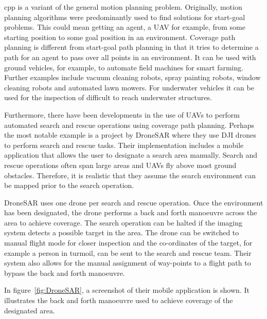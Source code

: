 \Acf{cpp} is a variant of the general motion planning problem. Originally, motion planning algorithms were predominantly used to find solutions for start-goal problems\cite{Choset2001}. This could mean getting an agent, a UAV for example, from some starting position to some goal position in an environment\cite{Lynch2017}. Coverage path planning is different from start-goal path planning in that it tries to determine a path for an agent to pass over all points in an environment\cite{Choset2001}. It can be used with ground vehicles, for example, to automate field machines for smart farming\cite{Hameed2014}. Further examples include vacuum cleaning robots, spray painting robots\cite{Atkar2005}, window cleaning robots\cite{Mir-Nasiri2018} and automated lawn mowers\cite{Arkin1999}. For underwater vehicles it can be used for the inspection of difficult to reach underwater structures\cite{Englot2012}. 

Furthermore, there have been developments in the use of UAVs to perform automated search and rescue operations using coverage path planning. Perhaps the most notable example is a project by DroneSAR where they use DJI drones to perform search and rescue tasks. Their implementation includes a mobile application that allows the user to designate a search area manually\cite{DroneSAR01}. Search and rescue operations often span large areas and UAVs fly above most ground obstacles. Therefore, it is realistic that they assume the search environment can be mapped prior to the search operation\cite{CPP-Survey-2013}.

DroneSAR uses one drone per search and rescue operation. Once the environment has been designated, the drone performs a back and forth manoeuvre across the area to achieve coverage. The search operation can be halted if the imaging system detects a possible target in the area. The drone can be switched to manual flight mode for closer inspection and the co-ordinates of the target, for example a person in turmoil, can be sent to the search and rescue team. Their system also allows for the manual assignment of way-points to a flight path to bypass the back and forth manoeuvre.\cite{DroneSAR02}

In figure~\ref{fig:DroneSAR}, a screenshot of their mobile application is shown. It illustrates the back and forth manoeuvre used to achieve coverage of the designated area.

